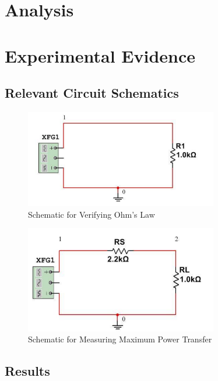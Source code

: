 \documentclass{article}
\begin{document}
  \section{Analysis}
  \label{sec:Analysis}
    \clearpage

  \section{Experimental Evidence}
  \label{sec:Experimental Evidence}
  
\subsection{Relevant Circuit Schematics}
\label{sub:Relevant Circuit Schematics}
  \begin{figure}[!ht]
  \centering
  \caption{Schematic for Verifying Ohm's Law\label{fig:ohmschem}}
  \includegraphics[width=0.75\textwidth]{img/c1.png}
  \end{figure}

  \begin{figure}[!ht]
  \centering
  \caption{Schematic for Measuring Maximum Power Transfer\label{fig:maxpowerschem}}
  \includegraphics[width=0.75\textwidth]{img/c2.png}
  \end{figure}


\clearpage

\subsection{Results}
\label{sub:Results}
\end{document}
